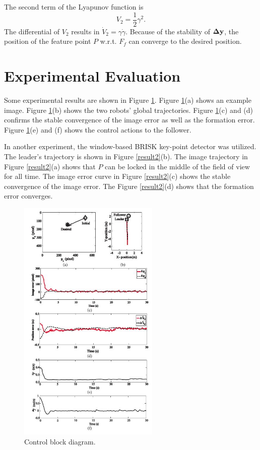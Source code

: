\documentclass[12pt,a4paper]{article}
\begin{document}
\indent The second term of the Lyapunov function is 
\begin{equation}
V_2=\frac{1}{2}\gamma^2.
\end{equation}
The differential of $V_2$ results in $\dot V_2=\gamma\dot\gamma$. Because of the stability of $\bf\Delta y$, the position of the feature point $P$ w.r.t. $F_f$ can converge to the desired position.


\section{Experimental Evaluation}

\indent Some experimental results are shown in Figure \ref{result1}. Figure \ref{result1}(a) shows an example image. Figure \ref{result1}(b) shows the two robots' global trajectories. Figure \ref{result1}(c) and (d) confirms the stable convergence of the image error as well as the formation error. Figure \ref{result1}(e) and (f) shows the control actions to the follower. 

\indent In another experiment, the window-based BRISK key-point detector was utilized. The leader's trajectory is shown in Figure \ref{result2}(b). The image trajectory in Figure \ref{result2}(a) shows that $P$ can be locked in the middle of the field of view for all time. The image error curve in Figure \ref{result2}(c) shows the stable convergence of the image error. The Figure \ref{result2}(d) shows that the formation error converges. 

\begin{figure}
  \centering
  \includegraphics[width=0.6\textwidth]{figs/result1.jpg}%
  \caption{Control block diagram.}
  \label{result1}
\end{figure}
\end{document}
